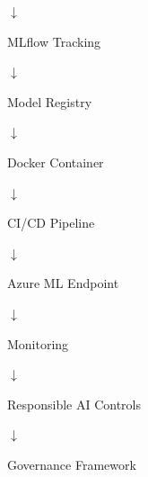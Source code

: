 \begin{center}
$\downarrow$
\end{center}

\begin{center}
MLflow Tracking
\end{center}

\begin{center}
$\downarrow$
\end{center}

\begin{center}
Model Registry
\end{center}

\begin{center}
$\downarrow$
\end{center}

\begin{center}
Docker Container
\end{center}

\begin{center}
$\downarrow$
\end{center}

\begin{center}
CI/CD Pipeline
\end{center}

\begin{center}
$\downarrow$
\end{center}

\begin{center}
Azure ML Endpoint
\end{center}

\begin{center}
$\downarrow$
\end{center}

\begin{center}
Monitoring
\end{center}

\begin{center}
$\downarrow$
\end{center}

\begin{center}
Responsible AI Controls
\end{center}

\begin{center}
$\downarrow$
\end{center}

\begin{center}
Governance Framework
\end{center}

